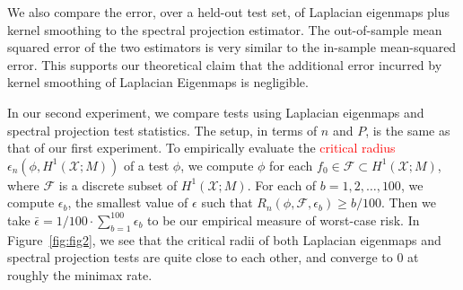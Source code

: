 \documentclass{article}
\newcommand{\1}{\mathbf{1}}
\newcommand{\mc}[1]{\mathcal{#1}}
\theoremstyle{alden}
\theoremstyle{aldenthm}
\theoremstyle{definition}
\theoremstyle{remark}
\begin{document}
We also compare the error, over a held-out test set, of Laplacian eigenmaps plus kernel smoothing to the spectral projection estimator. The out-of-sample mean squared error of the two estimators is very similar to the in-sample mean-squared error. This supports our theoretical claim that the additional error incurred by kernel smoothing of Laplacian Eigenmaps is negligible.

In our second experiment, we compare tests using Laplacian eigenmaps and spectral projection test statistics. The setup, in terms of $n$ and $P$, is the same as that of our first experiment. To empirically evaluate the \textcolor{red}{critical radius} $\epsilon_n(\phi,H^1(\mc{X};M))$ of a test $\phi$, we compute $\phi$ for each $f_0 \in \mc{F} \subset H^1(\mc{X};M)$, where $\mc{F}$ is a discrete subset of $H^1(\mc{X};M)$. For each of $b = 1,2,\ldots,100$, we compute $\epsilon_b$, the smallest value of $\epsilon$ such that $R_n(\phi,\mc{F},\epsilon_b) \geq b/100$. Then we take $\bar{\epsilon} = 1/100 \cdot \sum_{b = 1}^{100}\epsilon_b$ to be our empirical measure of worst-case risk. In Figure~\ref{fig:fig2}, we see that the critical radii of both Laplacian eigenmaps and spectral projection tests are quite close to each other, and converge to $0$ at roughly the minimax rate.
\end{document}
